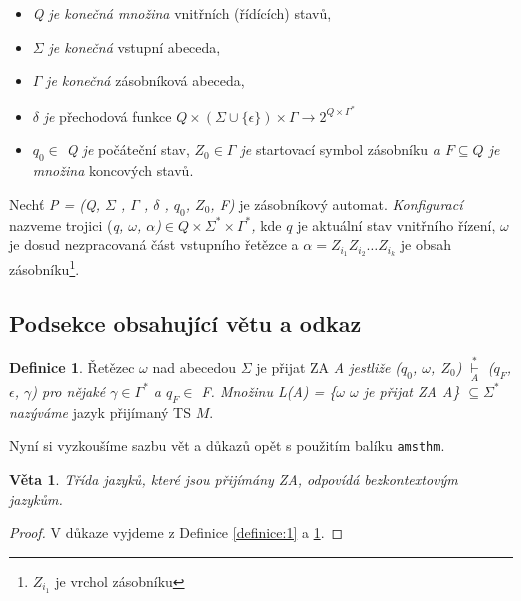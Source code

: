 \documentclass[a4paper,11pt]{article}
\theoremstyle{definition}
\newtheorem{definition}{Definice}
\theoremstyle{plain}
\newtheorem{plain}{Věta}
\begin{document}
{   \begin{itemize}
     \item \emph{Q je konečná množina} vnitřních (řídících) stavů,
     \item $\Sigma$ \emph{je konečná} vstupní abeceda,
     \item $\Gamma$ \emph{je konečná} zásobníková abeceda,
     \item $\delta$ \emph{je} přechodová funkce $Q \times ( \Sigma \cup \{\epsilon\})\times \Gamma \rightarrow 2^{Q\times \Gamma^{*}}$
     \item \emph{$q_{0} \in$ Q je} počáteční stav, \emph{$Z_{0} \in \Gamma$ je} startovací symbol zásobníku \emph{a $F \subseteq Q$ je množina} koncových stavů.
   \end{itemize}

   Nechť \emph{P = (Q, $\Sigma$ , $\Gamma$ , $\delta$ , $q_{0}$, $Z_{0}$, F)}
   je zásobníkový automat. \emph{Konfigurací} nazveme trojici
   (\emph{q, $\omega$, $\alpha$)$\in Q\times \Sigma^{*} \times \Gamma^{*}$, }
   kde $q$ je aktuální stav vnitřního řízení, $\omega$ je dosud nezpracovaná část vstupního řetězce a
   \emph{$\alpha = Z_{i_{1}}Z_{i_{2}}\dots Z_{i_{k}}$} je obsah zásobníku\footnote{\emph{$Z_{i_{1}}$} je vrchol zásobníku}.
   
  \subsection{Podsekce obsahující větu a odkaz}
  \begin{definition}{}\label{definice:2}
  Řetězec $\omega$ nad abecedou $\Sigma$ je přijat ZA \emph{A jestliže ($q_{0}$, $\omega$, $Z_{0}$) $\mathop{\vdash}\limits_{A}^{*}$ ($q_{F}$, $\epsilon$, $\gamma$) pro nějaké $\gamma \in \Gamma^{*}$ a $q_{F} \in$ F. Množinu L(A) = \{$\omega$ \textbar $\omega$ je přijat ZA A\} $\subseteq \Sigma^{*}$ nazýváme} jazyk přijímaný TS $M$.
  \end{definition}
  
  Nyní si vyzkoušíme sazbu vět a důkazů opět s použitím balíku \verb"amsthm".
  
  \begin{plain}{}
  Třída jazyků, které jsou přijímány ZA, odpovídá \textup{bezkontextovým jazykům.}
  \end{plain}
  
  \begin{proof}
  V důkaze vyjdeme z Definice \ref{definice:1} a \ref{definice:2}.
  \end{proof}

}
\end{document}

